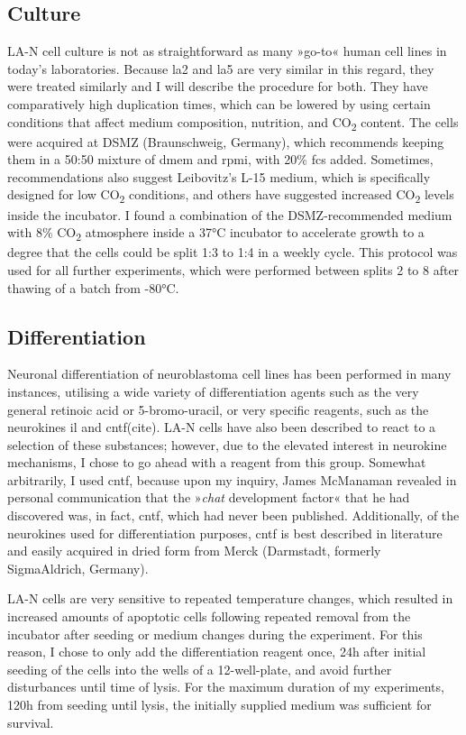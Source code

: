 \subsection{Culture}
LA-N cell culture is not as straightforward as many »go-to« human cell lines in today's laboratories. Because \ac{la2} and \ac{la5} are very similar in this regard, they were treated similarly and I will describe the procedure for both. They have comparatively high duplication times, which can be lowered by using certain conditions that affect medium composition, nutrition, and CO\textsubscript{2} content. The cells were acquired at DSMZ (Braunschweig, Germany), which recommends keeping them in a 50:50 mixture of \ac{dmem} and \ac{rpmi}, with 20\% \ac{fcs} added. Sometimes, recommendations also suggest Leibovitz's L-15 medium, which is specifically designed for low CO\textsubscript{2} conditions, and others have suggested increased CO\textsubscript{2} levels inside the incubator. I found a combination of the DSMZ-recommended medium with 8\% CO\textsubscript{2} atmosphere inside a 37°C incubator to accelerate growth to a degree that the cells could be split 1:3 to 1:4 in a weekly cycle. This protocol was used for all further experiments, which were performed between splits 2 to 8 after thawing of a batch from -80°C.

\subsection{Differentiation}
Neuronal differentiation of neuroblastoma cell lines has been performed in many instances, utilising a wide variety of differentiation agents such as the very general retinoic acid or 5-bromo-uracil, or very specific reagents, such as the neurokines \ac{il} and \ac{cntf}(cite). LA-N cells have also been described to react to a selection of these substances; however, due to the elevated interest in neurokine mechanisms, I chose to go ahead with a reagent from this group. Somewhat arbitrarily, I used \ac{cntf}, because upon my inquiry, James McManaman revealed in personal communication that the »\textit{\ac{chat}} development factor« that he had discovered\cite{McManaman1988} was, in fact, \ac{cntf}, which had never been published. Additionally, of the neurokines used for differentiation purposes, \ac{cntf} is best described in literature and easily acquired in dried form from Merck (Darmstadt, formerly SigmaAldrich, Germany).

LA-N cells are very sensitive to repeated temperature changes, which resulted in increased amounts of apoptotic cells following repeated removal from the incubator after seeding or medium changes during the experiment. For this reason, I chose to only add the differentiation reagent once, 24h after initial seeding of the cells into the wells of a 12-well-plate, and avoid further disturbances until time of lysis. For the maximum duration of my experiments, 120h from seeding until lysis, the initially supplied medium was sufficient for survival.


